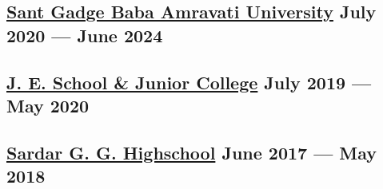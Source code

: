 





\subsection{{\href{https://www.sgbau.ac.in}{Sant Gadge Baba Amravati University} \hfill July 2020 --- June 2024}}

\vspace{0.25em}
\begin{null}

\end{null}

\subsection{{\href{https://schools.org.in/jalgaon/27031103410/j-e-sch-&-junior-college.html}{J. E. School \& 
Junior College} \hfill July 2019 --- May 2020}}
\begin{null}

\end{null}

\subsection{{\href{https://schools.org.in/jalgaon/27031408310/sardar-g-g-high-sch-raver.html}{Sardar G. G. Highschool} \hfill June 2017 --- May 2018}}
\begin{null}

\end{null}